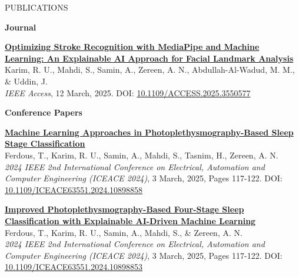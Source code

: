 \documentclass{resume} %
\begin{document}

\begin{rSection}{PUBLICATIONS}
\vspace{-.2em}

\textbf{Journal}
\item \textbf{\href{https://ieeexplore.ieee.org/document/10924203/}{Optimizing Stroke Recognition with MediaPipe and Machine Learning: An Explainable AI Approach for Facial Landmark Analysis}}\\
Karim, R. U., Mahdi, S., Samin, A., Zereen, A. N., Abdullah-Al-Wadud, M. M., \& Uddin, J.\\
\textit{IEEE Access}, 12 March, 2025. DOI: \href{https://ieeexplore.ieee.org/document/10924203/}{10.1109/ACCESS.2025.3550577}

\vspace{0.5em}
\textbf{Conference Papers}
\item \textbf{\href{https://ieeexplore.ieee.org/document/10898858}{Machine Learning Approaches in Photoplethysmography-Based Sleep Stage Classification}}\\
Ferdous, T., Karim, R. U., Samin, A., Mahdi, S., Tasnim, H., Zereen, A. N.\\
\textit{2024 IEEE 2nd International Conference on Electrical, Automation and Computer Engineering (ICEACE 2024)}, 3 March, 2025, Pages 117-122. DOI: \href{https://doi.org/10.1109/ICEACE63551.2024.10898858}{10.1109/ICEACE63551.2024.10898858}

\item \textbf{\href{https://ieeexplore.ieee.org/document/10898853}{Improved Photoplethysmography-Based Four-Stage Sleep Classification with Explainable AI-Driven Machine Learning}}\\
Ferdous, T., Karim, R. U., Samin, A., Mahdi, S., \& Zereen, A. N.\\
\textit{2024 IEEE 2nd International Conference on Electrical, Automation and Computer Engineering (ICEACE 2024)}, 3 March, 2025, Pages 117-122. DOI: \href{https://doi.org/10.1109/ICEACE63551.2024.10898853}{10.1109/ICEACE63551.2024.10898853}

\end{rSection}

\end{document}
